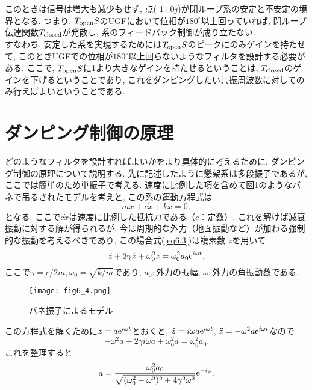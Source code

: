 このときは信号は増大も減少もせず, 点(-1+0$j$)が閉ループ系の安定と不安定の境界となる. つまり, $T_{\rm open}S$のUGFにおいて位相が$180^{\circ}$以上回っていれば, 閉ループ伝達関数$T_{\rm closed}$が発散し, 系のフィードバック制御が成り立たない. \\
\quad すなわち, 安定した系を実現するためには$T_{\rm open}S$のピークにのみゲインを持たせて, このときUGFでの位相が$180^{\circ}$以上回らないようなフィルタを設計する必要がある. ここで, $T_{\rm open}S$に1より大きなゲインを持たせるということは, $T_{\rm closed}$のゲインを下げるということであり, これをダンピングしたい共振周波数に対してのみ行えばよいということである. 
\section{ダンピング制御の原理}
\label{sec6.2}
どのようなフィルタを設計すればよいかをより具体的に考えるために, ダンピング制御の原理について説明する. 先に記述したように懸架系は多段振子であるが, ここでは簡単のため単振子で考える. 速度に比例した項を含めて図\ref{fig6.4}のようなバネで吊るされたモデルを考えと, この系の運動方程式は
\begin{equation}
m\ddot{x}+c\dot{x}+kx=0,
\label{eq6.3}
\end{equation}
となる. ここで$c\dot{x}$は速度に比例した抵抗力である（$c$：定数）. これを解けば減衰振動に対する解が得られるが, 今は周期的な外力（地面振動など）が加わる強制的な振動を考えるべきであり, この場合式(\ref{eq6.3})は複素数 $z$を用いて
\begin{equation}
\ddot{z}+2\gamma\dot{z}+\omega_0^2z=\omega_0^2a_0{\rm e}^{i\omega t},
\end{equation}
ここで$\gamma=c/2m,\omega_0=\sqrt{k/m}$であり, $a_0:$外力の振幅, $\omega:$外力の角振動数である. 
\begin{figure}[H]
\begin{center}
\texttt{[image: fig6\_4.png]}
\caption[バネ振子によるモデル]{バネ振子によるモデル}
\label{fig6.4}
\end{center}
\end{figure}
この方程式を解くために$z=a{\rm e}^{i\omega t}$とおくと, $\dot{z}=i\omega a{\rm e}^{i\omega t}$, $\ddot{z}=-\omega^2a{\rm e}^{i\omega t}$なので
\begin{equation}
-\omega^2a+2\gamma i\omega a+\omega_0^2a=\omega_0^2a_0.
\end{equation}
これを整理すると
\begin{equation}
a=\frac{\omega_0^2a_0}{\sqrt{(\omega_0^2-\omega^2)^2+4\gamma^2\omega^2}}{\rm e}^{-i\phi}.
\end{equation}
